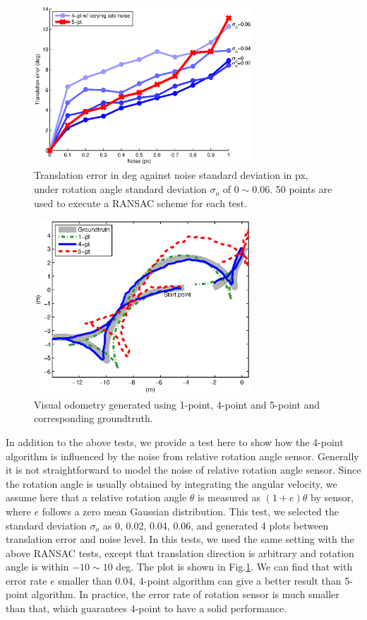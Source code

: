 \documentclass[letterpaper, 10 pt, conference]{ieeeconf}
\begin{document}
\begin{figure}
\begin{center}
	\includegraphics[width=3.2in]{odonoise.eps}
\caption{Translation error in deg against noise standard deviation in px, under rotation angle standard deviation $\sigma_o$ of $0 \sim 0.06$. 50 points are used to execute a RANSAC scheme for each test. }	
\label{OdonoiseFigure}
\end{center}

\end{figure}


\begin{figure}
\begin{center}
	\includegraphics[trim=0.5in 0.1in 0.5in 0in, clip=true, width=3.2in]{loopy.eps}
\end{center}
\caption{Visual odometry generated using 1-point, 4-point and 5-point and corresponding groundtruth. }
\label{TrajectoryFigure}
\end{figure}

In addition to the above tests, we provide a test here to show how the 4-point algorithm is influenced by the noise from relative rotation angle sensor. Generally it is not straightforward to model the noise of relative rotation angle sensor. Since the rotation angle is usually obtained by integrating the angular velocity, we assume here that a relative rotation angle $\theta$ is measured as $(1 + e) \theta$ by sensor, where $e$ follows a zero mean Gaussian distribution. This test, we selected the standard deviation $\sigma_o$ as 0, 0.02, 0.04, 0.06, and generated 4 plots between translation error and noise level. In this tests, we used the same setting with the above RANSAC tests, except that translation direction is arbitrary and rotation angle is within $-10 \sim 10$ deg. The plot is shown in Fig.\ref{OdonoiseFigure}. We can find that with error rate $e$ smaller than 0.04, 4-point algorithm can give a better result than 5-point algorithm. In practice, the error rate of rotation sensor is much smaller than that, which guarantees 4-point to have a solid performance. 
\end{document}
